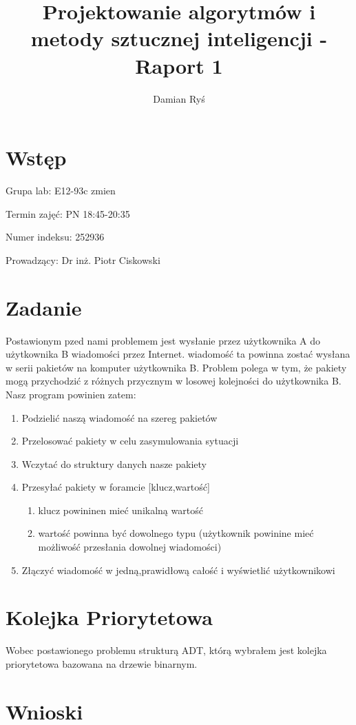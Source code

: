 \documentclass{article}
\title{Projektowanie algorytmów i metody sztucznej inteligencji - Raport 1}
\author{Damian Ryś}
\begin{document}
\maketitle


\tableofcontents
\section{Wstęp}
Grupa lab: E12-93c zmien

Termin zajęć: PN 18:45-20:35

Numer indeksu: 252936

Prowadzący: Dr inż. Piotr Ciskowski

\section{Zadanie}
Postawionym pzed nami problemem jest wysłanie przez użytkownika A do użytkownika B wiadomości przez Internet.
wiadomość ta powinna zostać wysłana w serii pakietów na komputer użytkownika B.
Problem polega w tym, że pakiety mogą przychodzić z różnych przycznym w losowej kolejności do użytkownika B.
Nasz program powinien zatem:
\begin{enumerate}
    \item Podzielić naszą wiadomość na szereg pakietów
    \item Przelosować pakiety w celu zasymulowania sytuacji
    \item Wczytać do struktury danych nasze pakiety
    \item Przesyłać pakiety w foramcie [klucz,wartość]
    \begin{enumerate}
        \item klucz powininen mieć unikalną wartość
        \item wartość powinna być dowolnego typu (użytkownik powinine mieć możliwość przesłania dowolnej wiadomości)
    \end{enumerate}
    \item Złączyć wiadomość w jedną,prawidłową całość i wyświetlić użytkownikowi
\end{enumerate}
\section{Kolejka Priorytetowa}
Wobec postawionego problemu strukturą ADT, którą wybrałem jest kolejka priorytetowa bazowana na drzewie binarnym.




\section{Wnioski}
\end{document}
